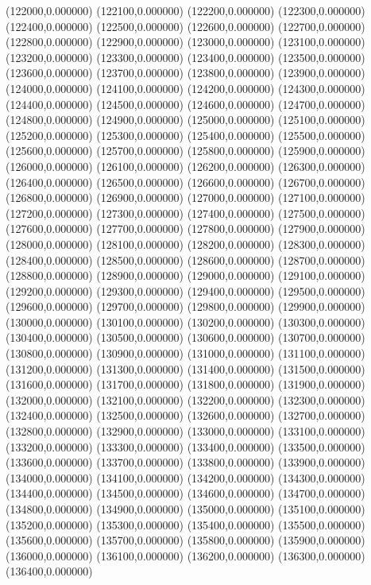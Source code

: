 (122000,0.000000)
(122100,0.000000)
(122200,0.000000)
(122300,0.000000)
(122400,0.000000)
(122500,0.000000)
(122600,0.000000)
(122700,0.000000)
(122800,0.000000)
(122900,0.000000)
(123000,0.000000)
(123100,0.000000)
(123200,0.000000)
(123300,0.000000)
(123400,0.000000)
(123500,0.000000)
(123600,0.000000)
(123700,0.000000)
(123800,0.000000)
(123900,0.000000)
(124000,0.000000)
(124100,0.000000)
(124200,0.000000)
(124300,0.000000)
(124400,0.000000)
(124500,0.000000)
(124600,0.000000)
(124700,0.000000)
(124800,0.000000)
(124900,0.000000)
(125000,0.000000)
(125100,0.000000)
(125200,0.000000)
(125300,0.000000)
(125400,0.000000)
(125500,0.000000)
(125600,0.000000)
(125700,0.000000)
(125800,0.000000)
(125900,0.000000)
(126000,0.000000)
(126100,0.000000)
(126200,0.000000)
(126300,0.000000)
(126400,0.000000)
(126500,0.000000)
(126600,0.000000)
(126700,0.000000)
(126800,0.000000)
(126900,0.000000)
(127000,0.000000)
(127100,0.000000)
(127200,0.000000)
(127300,0.000000)
(127400,0.000000)
(127500,0.000000)
(127600,0.000000)
(127700,0.000000)
(127800,0.000000)
(127900,0.000000)
(128000,0.000000)
(128100,0.000000)
(128200,0.000000)
(128300,0.000000)
(128400,0.000000)
(128500,0.000000)
(128600,0.000000)
(128700,0.000000)
(128800,0.000000)
(128900,0.000000)
(129000,0.000000)
(129100,0.000000)
(129200,0.000000)
(129300,0.000000)
(129400,0.000000)
(129500,0.000000)
(129600,0.000000)
(129700,0.000000)
(129800,0.000000)
(129900,0.000000)
(130000,0.000000)
(130100,0.000000)
(130200,0.000000)
(130300,0.000000)
(130400,0.000000)
(130500,0.000000)
(130600,0.000000)
(130700,0.000000)
(130800,0.000000)
(130900,0.000000)
(131000,0.000000)
(131100,0.000000)
(131200,0.000000)
(131300,0.000000)
(131400,0.000000)
(131500,0.000000)
(131600,0.000000)
(131700,0.000000)
(131800,0.000000)
(131900,0.000000)
(132000,0.000000)
(132100,0.000000)
(132200,0.000000)
(132300,0.000000)
(132400,0.000000)
(132500,0.000000)
(132600,0.000000)
(132700,0.000000)
(132800,0.000000)
(132900,0.000000)
(133000,0.000000)
(133100,0.000000)
(133200,0.000000)
(133300,0.000000)
(133400,0.000000)
(133500,0.000000)
(133600,0.000000)
(133700,0.000000)
(133800,0.000000)
(133900,0.000000)
(134000,0.000000)
(134100,0.000000)
(134200,0.000000)
(134300,0.000000)
(134400,0.000000)
(134500,0.000000)
(134600,0.000000)
(134700,0.000000)
(134800,0.000000)
(134900,0.000000)
(135000,0.000000)
(135100,0.000000)
(135200,0.000000)
(135300,0.000000)
(135400,0.000000)
(135500,0.000000)
(135600,0.000000)
(135700,0.000000)
(135800,0.000000)
(135900,0.000000)
(136000,0.000000)
(136100,0.000000)
(136200,0.000000)
(136300,0.000000)
(136400,0.000000)
